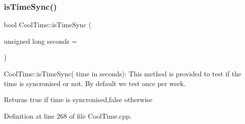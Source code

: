 \mbox{\label{class_cool_time_a5ae038a4498602b189f76a10bf02adf8}} 
\subsubsection{\texorpdfstring{is\+Time\+Sync()}{isTimeSync()}}
{\footnotesize\ttfamily bool Cool\+Time\+::is\+Time\+Sync (\begin{DoxyParamCaption}\item[{unsigned long}]{seconds = {} }\end{DoxyParamCaption})}

Cool\+Time\+::is\+Time\+Sync( time in seconds)\+: This method is provided to test if the time is syncronised or not. By default we test once per week.

\begin{DoxyReturn}{Returns}
true if time is syncronised,false otherwise 
\end{DoxyReturn}


Definition at line 268 of file Cool\+Time.\+cpp.


